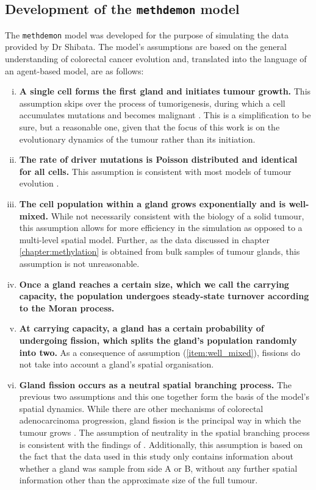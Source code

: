 \subsection{Development of the \texttt{methdemon} model}
The \texttt{methdemon} model was developed for the purpose of simulating the
data provided by Dr Shibata. The model's assumptions are based on the general
understanding of colorectal cancer evolution and, translated into the language
of an agent-based model, are as follows:

\begin{enumerate}[(i)]
    \item \textbf{A single cell forms the first gland and initiates tumour
        growth.} This assumption skips over the process of tumorigenesis,
        during which a cell accumulates mutations and becomes malignant
        \cite{tariq_colorectal_2016}. This is a simplification to be sure, but
        a reasonable one, given that the focus of this work is on the
        evolutionary dynamics of the tumour rather than its initiation.
    \item \textbf{The rate of driver mutations is Poisson distributed and
        identical for all cells.} This assumption is consistent with most
        models of tumour evolution \cite{metzcar_review_2019,
        niida_modeling_2021}.
    \item \textbf{The cell population within a gland grows exponentially and is
        well-mixed.} While not necessarily consistent with the biology of a
        solid tumour, this assumption allows for more efficiency in the
        simulation as opposed to a multi-level spatial model. Further, as the
        data discussed in chapter \ref{chapter:methylation} is obtained from
        bulk samples of tumour glands, this assumption is not unreasonable.
        \label{item:well_mixed}
    \item \textbf{Once a gland reaches a certain size, which we call the
        carrying capacity, the population undergoes steady-state turnover
        according to the Moran process.}
    \item \textbf{At carrying capacity, a gland has a certain probability of
        undergoing fission, which splits the gland's population randomly into
        two.} As a consequence of assumption (\ref{item:well_mixed}), fissions
        do not take into account a gland's spatial organisation.
    \item \textbf{Gland fission occurs as a neutral spatial branching process.}
        The previous two assumptions and this one together form the basis of
        the model's spatial dynamics. While there are other mechanisms of
        colorectal adenocarcinoma progression, gland fission is the principal
        way in which the tumour grows \cite{preston_bottom-up_nodate}. The
        assumption of neutrality in the spatial branching process is consistent
        with the findings of \cite{sottoriva_big_2015}. Additionally, this
        assumption is based on the fact that the data used in this study only
        contains information about whether a gland was sample from side A or B,
        without any further spatial information other than the approximate size
        of the full tumour.
\end{enumerate}

